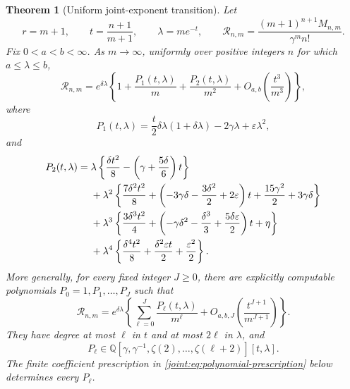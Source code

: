 \documentclass[11pt,a4paper]{article}
\numberwithin{equation}{section}
\theoremstyle{plain}
\newtheorem{theorem}{Theorem}[section]
\theoremstyle{definition}
\theoremstyle{remark}
\begin{document}
\begin{theorem}[Uniform joint-exponent transition]\label{joint:thm:transition}
Let
\[
 r=m+1,\qquad t=\frac{n+1}{m+1},\qquad
 \lambda=me^{-t},\qquad
 \mathcal R_{n,m}=\frac{(m+1)^{n+1}M_{n,m}}{\gamma^m n!}.
\]
Fix $0<a<b<\infty$. As $m\to\infty$, uniformly over positive
integers $n$ for which $a\leq\lambda\leq b$,
\begin{equation}\label{joint:eq:two-corrections}
 \mathcal R_{n,m}
 =e^{\delta\lambda}
 \left\{1+\frac{P_1(t,\lambda)}m
          +\frac{P_2(t,\lambda)}{m^2}
          +O_{a,b}\left(\frac{t^3}{m^3}\right)\right\},
\end{equation}
where
\begin{equation}\label{joint:eq:P1}
 P_1(t,\lambda)=\frac{t}{2}\delta\lambda(1+\delta\lambda)
                      -2\gamma\lambda+\varepsilon\lambda^2,
\end{equation}
and
\begin{align}
 P_2(t,\lambda)={}&
 \lambda\left\{\frac{\delta t^2}{8}
                    -\left(\gamma+\frac{5\delta}{6}\right)t\right\}
 \notag\\
 &+\lambda^2\left\{\frac{7\delta^2t^2}{8}
        +\left(-3\gamma\delta-\frac{3\delta^2}{2}
                        +2\varepsilon\right)t
        +\frac{15\gamma^2}{2}+3\gamma\delta\right\}\notag\\
 &+\lambda^3\left\{\frac{3\delta^3t^2}{4}
        +\left(-\gamma\delta^2-\frac{\delta^3}{3}
                           +\frac{5\delta\varepsilon}{2}\right)t
        +\eta\right\}\notag\\
 &+\lambda^4\left\{\frac{\delta^4t^2}{8}
                    +\frac{\delta^2\varepsilon t}{2}
                    +\frac{\varepsilon^2}{2}\right\}.
 \label{joint:eq:P2}
\end{align}
More generally, for every fixed integer $J\geq0$, there are explicitly
computable polynomials $P_0=1,P_1,\ldots,P_J$ such that
\begin{equation}\label{joint:eq:all-orders}
 \mathcal R_{n,m}=e^{\delta\lambda}
 \left\{\sum_{\ell=0}^J\frac{P_\ell(t,\lambda)}{m^\ell}
       +O_{a,b,J}\left(\frac{t^{J+1}}{m^{J+1}}\right)\right\}.
\end{equation}
They have degree at most $\ell$ in $t$ and at most $2\ell$ in
$\lambda$, and
\[
 P_\ell\in
 \mathbb Q[\gamma,\gamma^{-1},\zeta(2),\ldots,\zeta(\ell+2)]
 [t,\lambda].
\]
The finite coefficient prescription in
\eqref{joint:eq:polynomial-prescription} below determines every
$P_\ell$.
\end{theorem}
\end{document}
